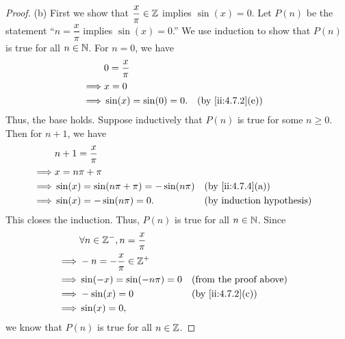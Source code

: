 \begin{proof}{(b)}
  First we show that \(\dfrac{x}{\pi} \in \mathbb{Z}\) implies \(\sin(x) = 0\).
  Let \(P(n)\) be the statement ``\(n = \dfrac{x}{\pi}\) implies \(\sin(x) = 0\).''
  We use induction to show that \(P(n)\) is true for all \(n \in \mathbb{N}\).
  For \(n = 0\), we have
  \begin{align*}
             & 0 = \dfrac{x}{\pi}                           \\
    \implies & x = 0                                        \\
    \implies & \sin(x) = \sin(0) = 0. &  & \by{ii:4.7.2}[e]
  \end{align*}
  Thus, the base holds.
  Suppose inductively that \(P(n)\) is true for some \(n \geq 0\).
  Then for \(n + 1\), we have
  \begin{align*}
             & n + 1 = \dfrac{x}{\pi}                                           \\
    \implies & x = n \pi + \pi                                                  \\
    \implies & \sin(x) = \sin(n \pi + \pi) = -\sin(n \pi) &  & \by{ii:4.7.4}[a] \\
    \implies & \sin(x) = -\sin(n \pi) = 0.                &  & \byIH
  \end{align*}
  This closes the induction.
  Thus, \(P(n)\) is true for all \(n \in \mathbb{N}\).
  Since
  \begin{align*}
             & \forall n \in \Z^-, n = \dfrac{x}{\pi}                                    \\
    \implies & -n = -\dfrac{x}{\pi} \in \Z^+                                             \\
    \implies & \sin(-x) = \sin(- n \pi) = 0           &  & \text{(from the proof above)} \\
    \implies & -\sin(x) = 0                           &  & \by{ii:4.7.2}[c]              \\
    \implies & \sin(x) = 0,
  \end{align*}
  we know that \(P(n)\) is true for all \(n \in \mathbb{Z}\).


\end{proof}
